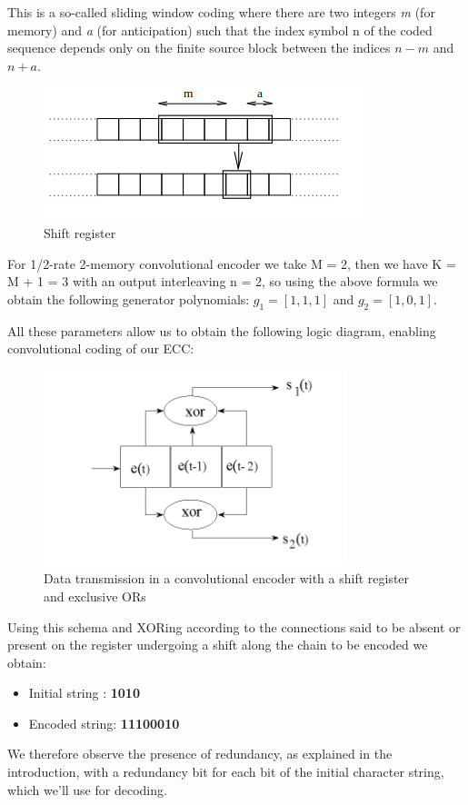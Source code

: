 This is a so-called sliding window coding where there are two integers \textit{m} (for memory) and \textit{a} (for anticipation) such that the index symbol n of the coded sequence depends only on the finite source block between the indices $n - m$ and $n + a$.
\begin{figure}[H]
    \centering
    \includegraphics[width=0.5\linewidth]{images/register.png}
    \caption{Shift register}
    \label{fig:shift-register}
\end{figure}

For 1/2-rate 2-memory convolutional encoder we take M = 2, then we have K = M + 1 = 3 with an output interleaving n = 2, so using the above formula we obtain the following generator polynomials: $g_{1} = [1, 1, 1]$ and $g_{2} = [1, 0, 1]$.

All these parameters allow us to obtain the following logic diagram, enabling convolutional coding of our ECC: 
\begin{figure}[H]
     \centering
     \includegraphics[width=0.5\linewidth]{images/logical_circuit.png}
     \caption{Data transmission in a convolutional encoder with a shift register and exclusive ORs}
     \label{fig:logical-circuit}
\end{figure}

Using this schema and XORing according to the connections said to be absent or present on the register undergoing a shift along the chain to be encoded we obtain:
\begin{itemize}
 \item Initial string : \textbf{1010}
 \item Encoded string: \textbf{11100010}
\end{itemize}

We therefore observe the presence of redundancy, as explained in the introduction, with a redundancy bit for each bit of the initial character string, which we'll use for decoding.

